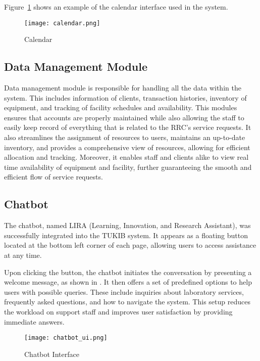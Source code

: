 Figure~\ref{fig:calendar} shows an example of the calendar interface used in the system.

\begin{figure}[H]
    \centering
    \texttt{[image: calendar.png]}
    \caption{Calendar}
    \label{fig:calendar}
\end{figure}

\newpage

\subsection{Data Management Module}

Data management module is responsible for handling all the data within the system. This includes information of clients, transaction histories, inventory of equipment, and tracking of facility schedules and availability. This modules ensures that accounts are properly maintained while also allowing the staff to easily keep record of everything that is related to the RRC's service requests. It also streamlines the assignment of resources to users, maintains an up-to-date inventory, and provides a comprehensive view of resources, allowing for efficient allocation and tracking. Moreover, it enables staff and clients alike to view real time availability of equipment and facility, further guaranteeing the smooth and efficient flow of  service requests.

\subsection{Chatbot}

The chatbot, named LIRA (Learning, Innovation, and Research Assistant), was successfully integrated into the TUKIB system. It appears as a floating button located at the bottom left corner of each page, allowing users to access assistance at any time.

Upon clicking the button, the chatbot initiates the conversation by presenting a welcome message, as shown in . It then offers a set of predefined options to help users with possible queries. These include inquiries about laboratory services, frequently asked questions, and how to navigate the system. This setup reduces the workload on support staff and improves user satisfaction by providing immediate answers.

\begin{figure}[h]
	\centering
	\texttt{[image: chatbot\_ui.png]}
	\caption{Chatbot Interface}
	\label{fig:chatbot_ui}
\end{figure}

